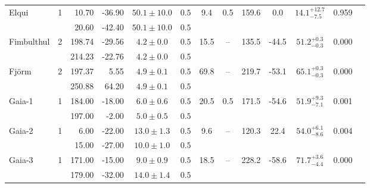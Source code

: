 \begin{tabular}{lcrrccccccccr}
	\multirow{2}{*}{Elqui} & \multirow{2}{*}{1} & 10.70 & -36.90 & $50.1 \pm 10.0$ & $0.5$ & \multirow{2}{*}{9.4} & \multirow{2}{*}{0.5} & \multirow{2}{*}{159.6} & \multirow{2}{*}{0.0} & \multirow{2}{*}{$14.1^{+12.7}_{-7.5}$} & \multirow{2}{*}{0.959} & \multirow{2}{*}{\citet{Shipp:2018}} \\
	 &  & 20.60 & -42.40 & $50.1 \pm 10.0$ & $0.5$ &  &  &  &  &  &  &  \\
	\multirow{2}{*}{Fimbulthul} & \multirow{2}{*}{2} & 198.74 & -29.56 & $4.2 \pm 0.0$ & $0.5$ & \multirow{2}{*}{15.5} & \multirow{2}{*}{--} & \multirow{2}{*}{135.5} & \multirow{2}{*}{-44.5} & \multirow{2}{*}{$51.2^{+0.3}_{-0.3}$} & \multirow{2}{*}{0.000} & \multirow{2}{*}{\citet{Ibata:2019}} \\
	 &  & 214.23 & -22.76 & $4.2 \pm 0.0$ & $0.5$ &  &  &  &  &  &  &  \\
	\multirow{2}{*}{Fj\"{o}rm} & \multirow{2}{*}{2} & 197.37 & 5.55 & $4.9 \pm 0.1$ & $0.5$ & \multirow{2}{*}{69.8} & \multirow{2}{*}{--} & \multirow{2}{*}{219.7} & \multirow{2}{*}{-53.1} & \multirow{2}{*}{$65.1^{+0.3}_{-0.3}$} & \multirow{2}{*}{0.000} & \multirow{2}{*}{\citet{Ibata:2019}} \\
	 &  & 250.88 & 64.20 & $4.9 \pm 0.1$ & $0.5$ &  &  &  &  &  &  &  \\
	\multirow{2}{*}{Gaia-1} & \multirow{2}{*}{1} & 184.00 & -18.00 & $6.0 \pm 0.6$ & $0.5$ & \multirow{2}{*}{20.5} & \multirow{2}{*}{0.5} & \multirow{2}{*}{171.5} & \multirow{2}{*}{-54.6} & \multirow{2}{*}{$51.9^{+9.3}_{-7.1}$} & \multirow{2}{*}{0.001} & \multirow{2}{*}{\citet{Malhan:2018}} \\
	 &  & 197.00 & -2.00 & $5.0 \pm 0.5$ & $0.5$ &  &  &  &  &  &  &  \\
	\multirow{2}{*}{Gaia-2} & \multirow{2}{*}{1} & 6.00 & -22.00 & $13.0 \pm 1.3$ & $0.5$ & \multirow{2}{*}{9.6} & \multirow{2}{*}{--} & \multirow{2}{*}{120.3} & \multirow{2}{*}{22.4} & \multirow{2}{*}{$54.0^{+6.1}_{-8.6}$} & \multirow{2}{*}{0.004} & \multirow{2}{*}{\citet{Malhan:2018}} \\
	 &  & 15.00 & -27.00 & $10.0 \pm 1.0$ & $0.5$ &  &  &  &  &  &  &  \\
	\multirow{2}{*}{Gaia-3} & \multirow{2}{*}{1} & 171.00 & -15.00 & $9.0 \pm 0.9$ & $0.5$ & \multirow{2}{*}{18.5} & \multirow{2}{*}{--} & \multirow{2}{*}{228.2} & \multirow{2}{*}{-58.6} & \multirow{2}{*}{$71.7^{+3.6}_{-4.4}$} & \multirow{2}{*}{0.000} & \multirow{2}{*}{\citet{Malhan:2018}} \\
	 &  & 179.00 & -32.00 & $14.0 \pm 1.4$ & $0.5$ &  &  &  &  &  &  &  \\

\end{tabular}
